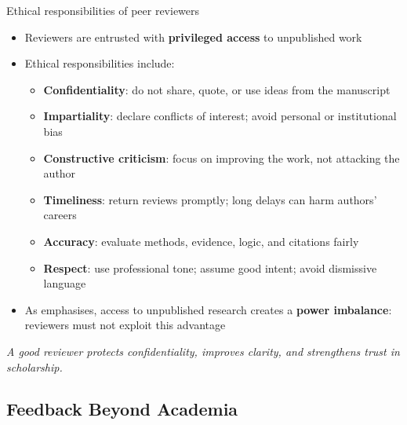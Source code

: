 \documentclass[aspectratio=169]{beamer}
\begin{document}
\begin{frame}{Ethical responsibilities of peer reviewers}
\begin{itemize}
  \item Reviewers are entrusted with \textbf{privileged access} to unpublished work
  \item Ethical responsibilities include:
    \begin{itemize}
      \item \textbf{Confidentiality}: do not share, quote, or use ideas from the manuscript
      \item \textbf{Impartiality}: declare conflicts of interest; avoid personal or institutional bias
      \item \textbf{Constructive criticism}: focus on improving the work, not attacking the author
      \item \textbf{Timeliness}: return reviews promptly; long delays can harm authors' careers
      \item \textbf{Accuracy}: evaluate methods, evidence, logic, and citations fairly
      \item \textbf{Respect}: use professional tone; assume good intent; avoid dismissive language
    \end{itemize}
  \item As \citet{rockwell2005prethics} emphasises, access to unpublished research creates a
        \textbf{power imbalance}: reviewers must not exploit this advantage
\end{itemize}
\medskip
\textit{A good reviewer protects confidentiality, improves clarity, and strengthens trust in scholarship.}
\end{frame}


\subsection{Feedback Beyond Academia}
\end{document}
